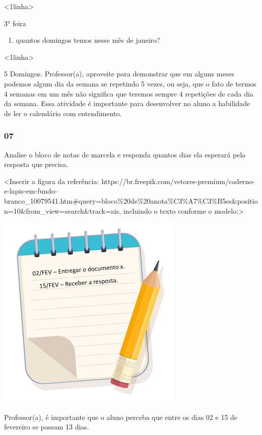 \textless{}1linha\textgreater{}

3° feira

\begin{enumerate}
\def\labelenumi{\Alph{enumi})}
\item
  quantos domingos temos nesse mês de janeiro?
\end{enumerate}

\textless{}1linha\textgreater{}

5 Domingos. Professor(a), aproveite para demonstrar que em alguns meses
podemos algum dia da semana se repetindo 5 vezes, ou seja, que o fato de
termos 4 semanas em um mês não significa que teremos sempre 4 repetições
de cada dia da semana. Essa atividade é importante para desenvolver no
aluno a habilidade de ler o calendário com entendimento.

\subsubsection{07}\label{section-45}

Analise o bloco de notas de marcela e responda quantos dias ela esperará
pela resposta que precisa.

\textless{}Inserir a figura da referência:
https://br.freepik.com/vetores-premium/caderno-e-lapis-em-fundo-branco\_10079541.htm\#query=bloco\%20de\%20anota\%C3\%A7\%C3\%B5es\&position=10\&from\_view=search\&track=ais,
incluindo o texto conforme o modelo:\textgreater{}

\includegraphics[width=3.51091in,height=3.72969in]{media/image37.png}

Professor(a), é importante que o aluno perceba que entre os dias 02 e 15
de fevereiro se passam 13 dias.

